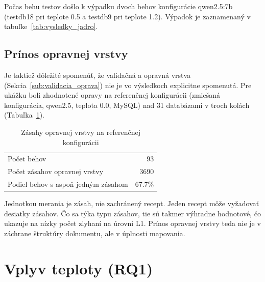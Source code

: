 Počas behu testov došlo k výpadku dvoch behov konfigurácie qwen2.5:7b (testdb18 pri teplote 0.5 a testdb9 pri teplote 1.2). Výpadok je zaznamenaný v tabuľke~\ref{tab:vysledky_jadro}.

\subsection{Prínos opravnej vrstvy}
Je taktiež dôležité spomenúť, že validačná a opravná vrstva (Sekcia~\ref{sub:validacia_oprava}) nie je vo výsledkoch explicitne spomenutá. Pre ukážku boli zhodnotené opravy na referenčnej konfigurácii (zmiešaná konfigurácia, qwen2.5, teplota 0.0, MySQL) nad 31 databázami v troch kolách (Tabuľka~\ref{tab:opravy}).


\begin{table}[H]
    \centering
    \begin{tabular}{l r}
    \toprule
       Počet behov  & 93 \\
       Počet zásahov opravnej vrstvy & 3690 \\
       Podiel behov s aspoň jedným zásahom  & 67.7\% \\
    \bottomrule
    \end{tabular}
    \caption{Zásahy opravnej vrstvy na referenčnej konfigurácii}
    \label{tab:opravy}
\end{table}

Jednotkou merania je zásah, nie zachránený recept. Jeden recept môže vyžadovať desiatky zásahov. Čo sa týka typu zásahov, tie sú takmer výhradne hodnotové, čo ukazuje na nízky počet zlyhaní na úrovni L1. Prínos opravnej vrstvy teda nie je v záchrane štruktúry dokumentu, ale v úplnosti mapovania.

\section{Vplyv teploty (RQ1)}

